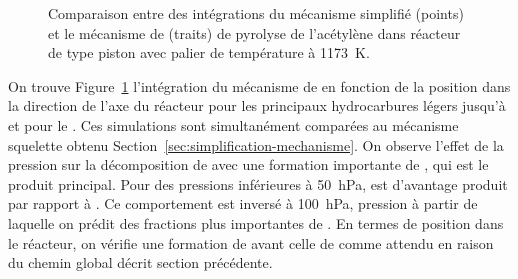 \begin{figure}[!hb]
	\centering{}
	
	\caption{\label{norinaga-comparison-simplification-1173K}Comparaison entre des intégrations du mécanisme simplifié (points) et le mécanisme de \citet{Norinaga2009} (traits) de pyrolyse de l'acétylène dans réacteur de type piston avec palier de température à \SI{1173}{\kelvin}.}
\end{figure}

On trouve Figure~\ref{norinaga-comparison-simplification-1173K} l'intégration du mécanisme de \citet{Norinaga2009} en fonction de la position dans la direction de l'axe du réacteur pour les principaux hydrocarbures légers \textendash{} jusqu'à  \textendash{} et pour le . Ces simulations sont simultanément comparées au mécanisme squelette obtenu Section~\ref{sec:simplification-mechanisme}. On observe l'effet de la pression sur la décomposition de  avec une formation importante de , qui est le produit principal. Pour des pressions inférieures à \SI{50}{\hecto\pascal},  est d'avantage produit par rapport à . Ce comportement est inversé à \SI{100}{\hecto\pascal}, pression à partir de laquelle on prédit des fractions plus importantes de . En termes de position dans le réacteur, on vérifie une formation de  avant celle de  comme attendu en raison du chemin global décrit section précédente. 

